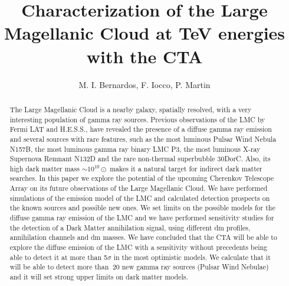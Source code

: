 \documentclass{article}
\title{Characterization of the Large Magellanic Cloud at TeV energies with the CTA}
\author{M. I. Bernardos, F. Iocco, P. Martin}
\date{}
\begin{document}
\maketitle
\begin{abstract}
    The Large Magellanic Cloud is a nearby galaxy, spatially resolved, with a very interesting population of gamma ray sources. Previous observations of the LMC by Fermi LAT and H.E.S.S., have revealed the presence of a diffuse gamma ray emission and several sources with rare features, such as the most luminous Pulsar Wind Nebula N157B, the most luminous gamma ray binary LMC P3, the most luminous X-ray Supernova Remnant N132D and the rare non-thermal superbubble 30DorC. Also, its high dark matter mass $\sim 10^{10}\odot$ makes it a natural target for indirect dark matter searches. 
    In this paper we explore the potential of the upcoming Cherenkov Telescope Array on its future observations of the Large Magellanic Cloud. We have performed simulations of the emission model of the LMC and calculated detection prospects on the known sources and possible new ones. 
    We set limits on the possible models for the diffuse gamma ray emission of the LMC and we have performed sensitivity studies for the detection of a Dark Matter annihilation signal, using different \gls{dm} profiles, annihilation channels and \gls{dm} masses.
    We have concluded that the CTA will be able to explore the diffuse emission of the LMC with a sensitivity without precedents being able to detect it at more than 5$\sigma$ in the most optimistic models. We calculate that it will be able to detect more than $~20$ new gamma ray sources (Pulsar Wind Nebulae) and it will set strong upper limits on dark matter models. 
    
\end{abstract}
\end{document}
